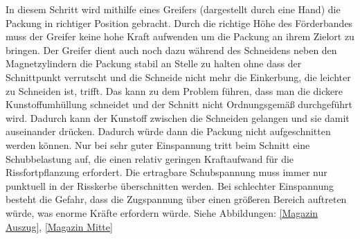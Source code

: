 In diesem Schritt wird mithilfe eines Greifers (dargestellt durch eine Hand) die Packung in richtiger Position gebracht.
Durch die richtige Höhe des Förderbandes muss der Greifer keine hohe Kraft aufwenden um die Packung an ihrem Zielort zu bringen. Der Greifer dient auch noch dazu während des Schneidens neben den Magnetzylindern die Packung stabil an Stelle zu halten ohne dass der Schnittpunkt verrutscht und die Schneide nicht mehr die Einkerbung, die leichter zu Schneiden ist, trifft. Das kann zu dem Problem führen, dass man die dickere Kunstoffumhüllung schneidet und der Schnitt nicht Ordnungsgemäß durchgeführt wird. Dadurch kann der Kunstoff zwischen die Schneiden gelangen und sie damit auseinander drücken. Dadurch würde dann die Packung nicht aufgeschnitten werden können. Nur bei sehr guter Einspannung tritt beim Schnitt eine Schubbelastung auf, die einen relativ geringen Kraftaufwand für die Rissfortpflanzung erfordert. Die ertragbare Schubspannung muss immer nur punktuell in der Risskerbe überschnitten werden. Bei schlechter Einspannung besteht die Gefahr, dass die Zugspannung über einen größeren Bereich auftreten würde, was enorme Kräfte erfordern würde. Siehe Abbildungen: \ref{Magazin Auszug}, \ref{Magazin Mitte}


